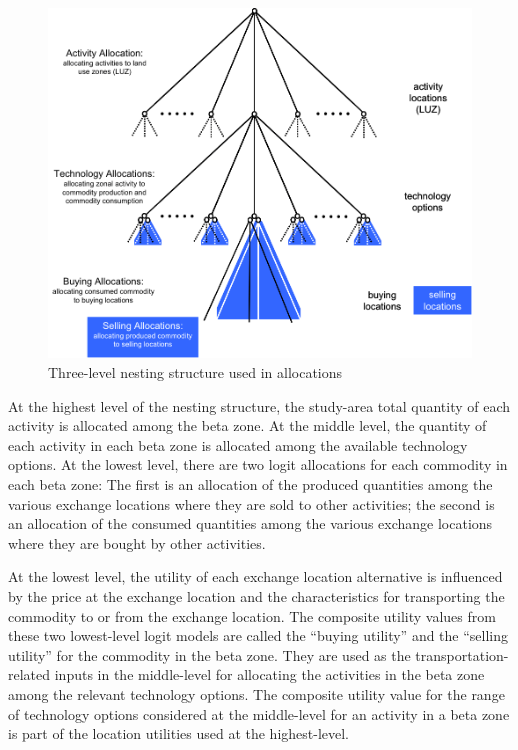 \begin{figure}[!t]
\centering
\includegraphics[scale=0.45]{aa/nesting-structure}
\caption{Three-level nesting structure used in allocations }\label{fig:aa-nesting-structure}
\end{figure}

At the highest level of the nesting structure, the study-area total quantity of each activity is allocated among the beta zone. At the middle level, the quantity of each activity in each beta zone is allocated among the available technology options. At the lowest level, there are two logit allocations for each commodity in each beta zone: The first is an allocation of the produced quantities among the various exchange locations where they are sold to other activities; the second is an allocation of the consumed quantities among the various exchange locations where they are bought by other activities.

At the lowest level, the utility of each exchange location alternative is influenced by the price at the exchange location and the characteristics for transporting the commodity to or from the exchange location.  The composite utility values from these two lowest-level logit models are called the ``buying utility'' and the ``selling utility'' for the commodity in the beta zone. They are used as the transportation-related inputs in the middle-level for allocating the activities in the beta zone among the relevant technology options. The composite utility value for the range of technology options considered at the middle-level for an activity in a beta zone is part of the location utilities used at the highest-level.

